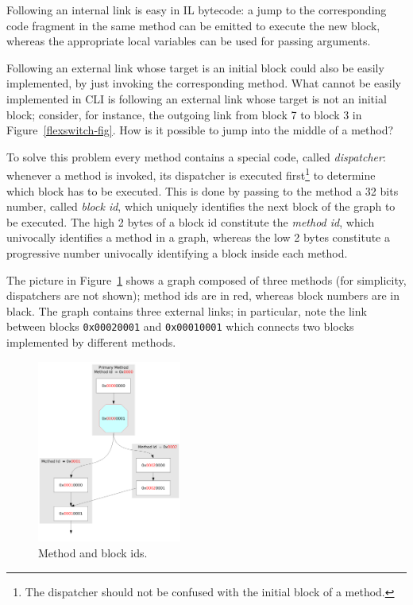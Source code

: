 Following an internal link is easy in IL bytecode: a jump to
the corresponding code fragment in the same method can be emitted 
to execute the new block, whereas the appropriate local variables can be
used for passing arguments. 

Following an external link whose target is an initial block could also
be easily implemented, by just invoking the corresponding method.
What cannot be easily implemented in CLI is following an external link
whose target is not an initial block; consider, for instance, the
outgoing link from block 7 to block 3 in Figure~\ref{flexswitch-fig}. How is it possible to jump into
the middle of a method?

To solve this problem every method contains a special code, called
\emph{dispatcher}: whenever a method is invoked, its dispatcher is
executed first\footnote{The dispatcher should not be
confused with the initial block of a method.} to
determine which block has to be executed.
This is done by passing to the method a 32 bits number, called 
\emph{block id}, which uniquely identifies the next block of the graph to be executed.
The high 2 bytes of a block id constitute the \emph{method id}, which 
univocally identifies a method in a graph, whereas the low 2 bytes constitute
a progressive number univocally identifying a block inside each method.

The picture in Figure~\ref{block-id-fig} shows a graph composed of three methods (for
simplicity, dispatchers are not shown); method ids are in red, whereas
block numbers are in black. 
The graph contains three external links; in particular, note the link
between blocks \texttt{0x00020001} and \texttt{0x00010001} which
connects two blocks implemented by different methods.
\begin{figure}[h]
\begin{center}
\includegraphics[height=6cm]{blockid}
\caption{Method and block ids.}\label{block-id-fig}
\end{center}
\end{figure}

